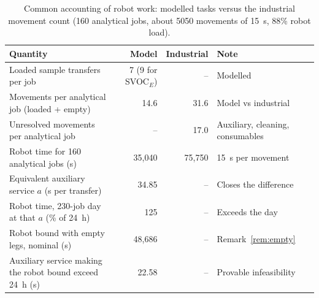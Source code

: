 \begin{table}[tbp]
\caption{Common accounting of robot work: modelled tasks versus the industrial movement count (160 analytical jobs, about 5050 movements of 15~s, 88\% robot load).\label{tab:robot-accounting}}
\centering
\footnotesize
\begin{tabular}{p{5.6cm}rrp{3.4cm}}
\toprule
Quantity & Model & Industrial & Note\\
\midrule
Loaded sample transfers per job & 7 (9 for SVOC$_E$) & -- & Modelled\\
Movements per analytical job (loaded + empty) & 14.6 & 31.6 & Model vs industrial\\
Unresolved movements per analytical job & -- & 17.0 & Auxiliary, cleaning, consumables\\
Robot time for 160 analytical jobs (s) & 35,040 & 75,750 & 15~s per movement\\
Equivalent auxiliary service $a$ (s per transfer) & 34.85 & -- & Closes the difference\\
Robot time, 230-job day at that $a$ (\% of 24~h) & 125 & -- & Exceeds the day\\
Robot bound with empty legs, nominal (s) & 48,686 & -- & Remark~\ref{rem:empty}\\
Auxiliary service making the robot bound exceed 24~h (s) & 22.58 & -- & Provable infeasibility\\
\bottomrule
\end{tabular}
\end{table}

